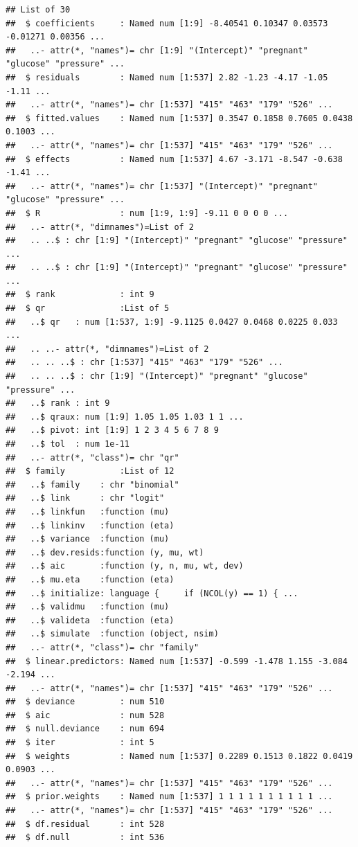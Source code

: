 \documentclass[
]{article}
\begin{document}
\begin{verbatim}
## List of 30
##  $ coefficients     : Named num [1:9] -8.40541 0.10347 0.03573 -0.01271 0.00356 ...
##   ..- attr(*, "names")= chr [1:9] "(Intercept)" "pregnant" "glucose" "pressure" ...
##  $ residuals        : Named num [1:537] 2.82 -1.23 -4.17 -1.05 -1.11 ...
##   ..- attr(*, "names")= chr [1:537] "415" "463" "179" "526" ...
##  $ fitted.values    : Named num [1:537] 0.3547 0.1858 0.7605 0.0438 0.1003 ...
##   ..- attr(*, "names")= chr [1:537] "415" "463" "179" "526" ...
##  $ effects          : Named num [1:537] 4.67 -3.171 -8.547 -0.638 -1.41 ...
##   ..- attr(*, "names")= chr [1:537] "(Intercept)" "pregnant" "glucose" "pressure" ...
##  $ R                : num [1:9, 1:9] -9.11 0 0 0 0 ...
##   ..- attr(*, "dimnames")=List of 2
##   .. ..$ : chr [1:9] "(Intercept)" "pregnant" "glucose" "pressure" ...
##   .. ..$ : chr [1:9] "(Intercept)" "pregnant" "glucose" "pressure" ...
##  $ rank             : int 9
##  $ qr               :List of 5
##   ..$ qr   : num [1:537, 1:9] -9.1125 0.0427 0.0468 0.0225 0.033 ...
##   .. ..- attr(*, "dimnames")=List of 2
##   .. .. ..$ : chr [1:537] "415" "463" "179" "526" ...
##   .. .. ..$ : chr [1:9] "(Intercept)" "pregnant" "glucose" "pressure" ...
##   ..$ rank : int 9
##   ..$ qraux: num [1:9] 1.05 1.05 1.03 1 1 ...
##   ..$ pivot: int [1:9] 1 2 3 4 5 6 7 8 9
##   ..$ tol  : num 1e-11
##   ..- attr(*, "class")= chr "qr"
##  $ family           :List of 12
##   ..$ family    : chr "binomial"
##   ..$ link      : chr "logit"
##   ..$ linkfun   :function (mu)  
##   ..$ linkinv   :function (eta)  
##   ..$ variance  :function (mu)  
##   ..$ dev.resids:function (y, mu, wt)  
##   ..$ aic       :function (y, n, mu, wt, dev)  
##   ..$ mu.eta    :function (eta)  
##   ..$ initialize: language {     if (NCOL(y) == 1) { ...
##   ..$ validmu   :function (mu)  
##   ..$ valideta  :function (eta)  
##   ..$ simulate  :function (object, nsim)  
##   ..- attr(*, "class")= chr "family"
##  $ linear.predictors: Named num [1:537] -0.599 -1.478 1.155 -3.084 -2.194 ...
##   ..- attr(*, "names")= chr [1:537] "415" "463" "179" "526" ...
##  $ deviance         : num 510
##  $ aic              : num 528
##  $ null.deviance    : num 694
##  $ iter             : int 5
##  $ weights          : Named num [1:537] 0.2289 0.1513 0.1822 0.0419 0.0903 ...
##   ..- attr(*, "names")= chr [1:537] "415" "463" "179" "526" ...
##  $ prior.weights    : Named num [1:537] 1 1 1 1 1 1 1 1 1 1 ...
##   ..- attr(*, "names")= chr [1:537] "415" "463" "179" "526" ...
##  $ df.residual      : int 528
##  $ df.null          : int 536

\end{verbatim}
\end{document}
